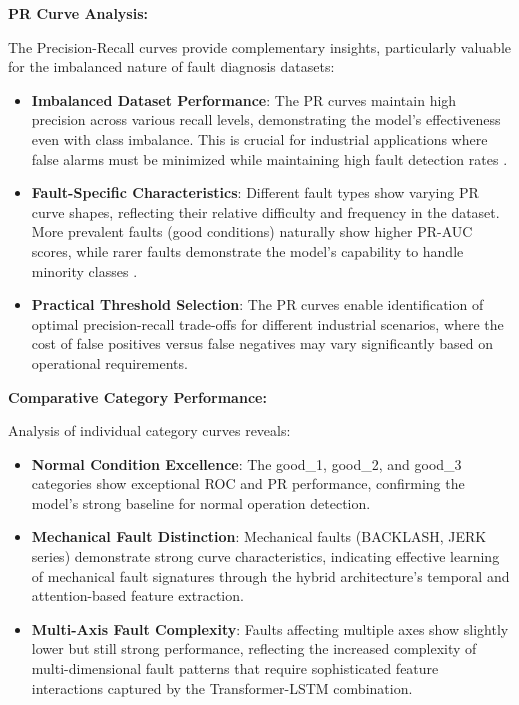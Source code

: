 \textbf{PR Curve Analysis:}

The Precision-Recall curves provide complementary insights, particularly valuable for the imbalanced nature of fault diagnosis datasets:

\begin{itemize}
    \item \textbf{Imbalanced Dataset Performance}: The PR curves maintain high precision across various recall levels, demonstrating the model's effectiveness even with class imbalance. This is crucial for industrial applications where false alarms must be minimized while maintaining high fault detection rates \citep{saito2015precision}.
    
    \item \textbf{Fault-Specific Characteristics}: Different fault types show varying PR curve shapes, reflecting their relative difficulty and frequency in the dataset. More prevalent faults (good conditions) naturally show higher PR-AUC scores, while rarer faults demonstrate the model's capability to handle minority classes \citep{davis2006relationship}.
    
    \item \textbf{Practical Threshold Selection}: The PR curves enable identification of optimal precision-recall trade-offs for different industrial scenarios, where the cost of false positives versus false negatives may vary significantly based on operational requirements.
\end{itemize}

\textbf{Comparative Category Performance:}

Analysis of individual category curves reveals:

\begin{itemize}
    \item \textbf{Normal Condition Excellence}: The good\_1, good\_2, and good\_3 categories show exceptional ROC and PR performance, confirming the model's strong baseline for normal operation detection.
    
    \item \textbf{Mechanical Fault Distinction}: Mechanical faults (BACKLASH, JERK series) demonstrate strong curve characteristics, indicating effective learning of mechanical fault signatures through the hybrid architecture's temporal and attention-based feature extraction.
    
    \item \textbf{Multi-Axis Fault Complexity}: Faults affecting multiple axes show slightly lower but still strong performance, reflecting the increased complexity of multi-dimensional fault patterns that require sophisticated feature interactions captured by the Transformer-LSTM combination.
\end{itemize}

